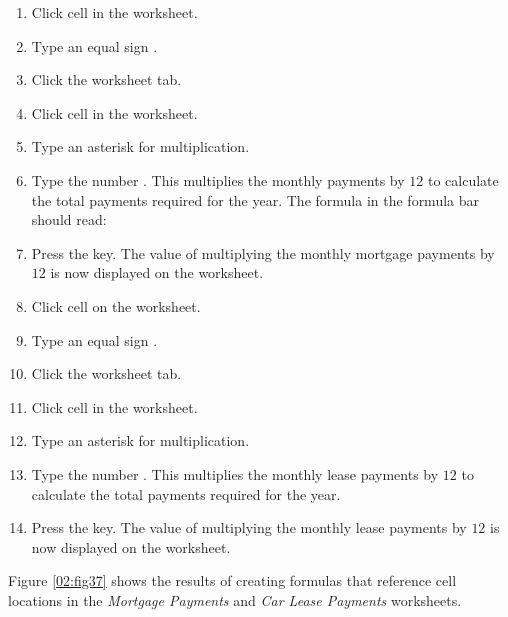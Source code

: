 \begin{enumerate}
	\item Click cell  in the  worksheet.
	\item Type an equal sign \fmtTyping{=}.
	\item Click the  worksheet tab.
	\item Click cell  in the  worksheet.
	\item Type an asterisk \fmtTyping{*} for multiplication.
	\item Type the number . This multiplies the monthly payments by $ 12 $ to calculate the total payments required for the year. The formula in the formula bar should read: 
	\item Press the  key. The value of multiplying the monthly mortgage payments by $ 12 $ is now displayed on the  worksheet.
	\item Click cell  on the  worksheet.
	\item Type an equal sign \fmtTyping{=}.
	\item Click the  worksheet tab.
	\item Click cell  in the  worksheet.
	\item Type an asterisk \fmtTyping{*} for multiplication.
	\item Type the number . This multiplies the monthly lease payments by $ 12 $ to calculate the total payments required for the year.
	\item Press the  key. The value of multiplying the monthly lease payments by $ 12 $ is now displayed on the  worksheet.
\end{enumerate}

Figure \ref{02:fig37} shows the results of creating formulas that reference cell locations in the \textit{Mortgage Payments} and \textit{Car Lease Payments} worksheets.

